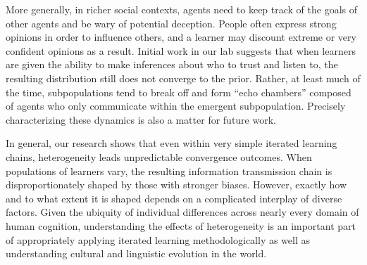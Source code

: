 \documentclass[doc]{apa6}
\begin{document}
More generally, in richer social contexts, agents need to keep track of the goals of other agents and be wary of potential deception. People often express strong opinions in order to influence others, and a learner may discount extreme or very confident opinions as a result. Initial work in our lab suggests that when learners are given the ability to make inferences about who to trust and listen to, the resulting distribution still does not converge to the prior. Rather, at least much of the time, subpopulations tend to break off and form ``echo chambers'' composed of agents who only communicate within the emergent subpopulation. Precisely characterizing these dynamics is also a matter for future work.

In general, our research shows that even within very simple iterated learning chains, heterogeneity leads unpredictable convergence outcomes. When populations of learners vary, the resulting information transmission chain is disproportionately shaped by those with stronger biases. However, exactly how and to what extent it is shaped depends on a complicated interplay of diverse factors. Given the ubiquity of individual differences across nearly every domain of human cognition, understanding the effects of heterogeneity is an important part of appropriately applying iterated learning methodologically as well as understanding cultural and linguistic evolution in the world.


\printbibliography
\end{document}
